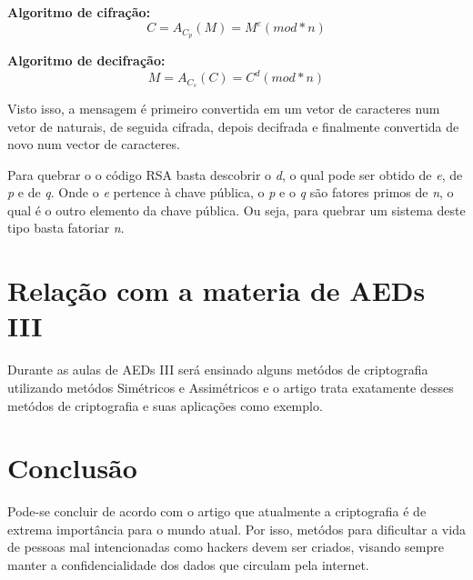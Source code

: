 \documentclass[12pt]{article}
\begin{document}
\textbf{Algoritmo de cifração:} \[C = A_C_p(M) = M^e(mod*n)\]

\textbf{Algoritmo de decifração:} \[M = A_C_s(C) = C^d(mod*n)\]

Visto isso, a mensagem é primeiro convertida em um vetor de caracteres num vetor de naturais, de seguida cifrada,
depois decifrada e finalmente convertida de novo num vector de caracteres.

Para quebrar o o código RSA basta descobrir o  {\itshape d}, o qual pode ser obtido de  {\itshape e}, de  {\itshape p} e de  {\itshape q}. Onde o  {\itshape e} pertence à chave pública, o  {\itshape p} e o  {\itshape q} são fatores primos de  {\itshape n}, o qual é o outro elemento da chave pública. Ou seja, para quebrar um sistema deste tipo basta fatoriar  {\itshape n}.

\section{Relação com a materia de AEDs III}
Durante as aulas de AEDs III será ensinado alguns metódos de criptografia utilizando metódos Simétricos e Assimétricos e o artigo trata exatamente desses metódos de criptografia e suas aplicações como exemplo.

\section{Conclusão}
Pode-se concluir de acordo com o artigo que atualmente a criptografia é de extrema importância para o mundo atual. Por isso, metódos para dificultar a vida de pessoas mal intencionadas como hackers devem ser criados, visando sempre manter a confidencialidade dos dados que circulam pela internet.
\end{document}
